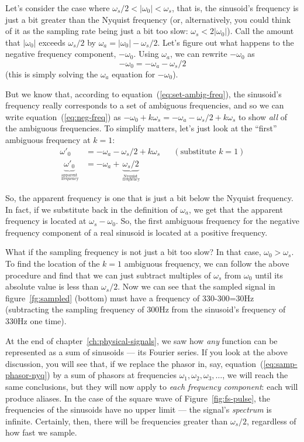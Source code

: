 Let's consider the case where $\omega_s/2 < |\omega_0| < \omega_s$,
that is, the sinusoid's frequency is just a bit greater than the
Nyquist frequency (or, alternatively, you could think of it as the
sampling rate being just a bit too slow: $\omega_s <
2|\omega_0|$). Call the amount that $|\omega_0|$ exceeds $\omega_s/2$
by $\omega_a = |\omega_0| - \omega_s/2$.  Let's figure out what
happens to the negative frequency component, $-\omega_0$. Using
$\omega_a$, we can rewrite $-\omega_0$ as 
\begin{equation}
-\omega_0 = -\omega_a - \omega_s/2
\label{eq:neg-freq}
\end{equation}
(this is simply solving the $\omega_a$ equation for $-\omega_0$).

But we know that, according to equation~(\ref{eq:set-ambig-freq}), the
sinusoid's frequency really corresponds to a set of ambiguous
frequencies, and so we can write equation~(\ref{eq:neg-freq}) as
$-\omega_0 + k\omega_s = -\omega_a - \omega_s/2 + k\omega_s$ to show
\emph{all} of the ambiguous frequencies. To simplify matters, let's
just look at the ``first'' ambiguous frequency at $k=1$:
\begin{align*}
\omega'_0 &= -\omega_a- \omega_s/2 + k\omega_s && (\text{substitute $k=1$}) \\
\underbrace{\omega'_0}_{\stackrel{\text{apparent}}{_\text{ frequency}}} &= - \omega_a +
     \underbrace{\omega_s/2}_{\stackrel{\text{Nyquist}}{_\text{ frequency}}}
\end{align*}

So, the apparent frequency is one that is just a bit below the Nyquist
frequency. In fact, if we substitute back in the definition of
$\omega_a$, we get that the apparent frequency is located at $\omega_s
- \omega_0$. So, the first ambiguous frequency for the negative
frequency component of a real sinusoid is located at a positive
frequency.

What if the sampling frequency is not just a bit too slow? In that
case, $\omega_0 > \omega_s$. To find the location of the $k=1$
ambiguous frequency, we can follow the above procedure and find that
we can just subtract multiples of $\omega_s$ from $\omega_0$ until its
absolute value is less than $\omega_s/2$.  Now we can see that the
sampled signal in figure~\ref{fg:sampled} (bottom) must have a frequency of
330-300=30Hz (subtracting the sampling frequency of 300Hz from the
sinusoid's frequency of 330Hz one time).

At the end of chapter~\ref{ch:physical-signals}, we saw how
\emph{any} function can be represented as a sum of sinusoids --- its
Fourier series. If you look at the above discussion, you will see
that, if we replace the phasor in, say,
equation~(\ref{eq:samp-phasor-nyq}) by a sum of phasors at frequencies
$\omega_1, \omega_2, \omega_3, \ldots$, we will reach the same
conclusions, but they will now apply to \emph{each frequency
  component}: each will produce aliases. In the case of the square
wave of Figure~\ref{fig:fs-pulse}, the frequencies of the sinusoids
have no upper limit --- the signal's \emph{spectrum} is infinite.
Certainly, then, there will be frequencies greater than $\omega_s/2$,
regardless of how fast we sample.

